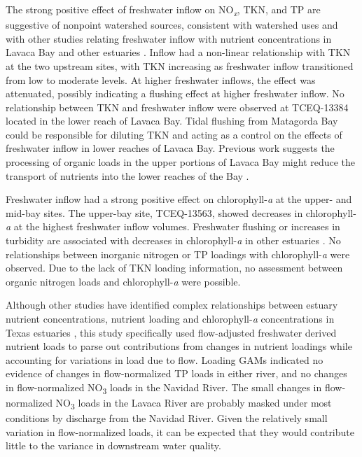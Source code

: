 \documentclass[sn-basic,referee,lineno,pdflatex]{sn-jnl}
\begin{document}
The strong positive effect of freshwater inflow on
NO\textsubscript{\emph{x}}, TKN, and TP are suggestive of nonpoint
watershed sources, consistent with watershed uses and with other studies
relating freshwater inflow with nutrient concentrations in Lavaca Bay
and other estuaries
\citep{russell_effect_2006, caffreyHighNutrientPulses2007, peierlsNonmonotonicResponsesPhytoplankton2012, palmerImpactsDroughtsLow2015, ciraPhytoplanktonDynamicsLowinflow2021}.
Inflow had a non-linear relationship with TKN at the two upstream sites,
with TKN increasing as freshwater inflow transitioned from low to
moderate levels. At higher freshwater inflows, the effect was
attenuated, possibly indicating a flushing effect at higher freshwater
inflow. No relationship between TKN and freshwater inflow were observed
at TCEQ-13384 located in the lower reach of Lavaca Bay. Tidal flushing
from Matagorda Bay could be responsible for diluting TKN and acting as a
control on the effects of freshwater inflow in lower reaches of Lavaca
Bay. Previous work suggests the processing of organic loads in the upper
portions of Lavaca Bay might reduce the transport of nutrients into the
lower reaches of the Bay \citep{russell_effect_2006}.

Freshwater inflow had a strong positive effect on chlorophyll-\emph{a}
at the upper- and mid-bay sites. The upper-bay site, TCEQ-13563, showed
decreases in chlorophyll-\emph{a} at the highest freshwater inflow
volumes. Freshwater flushing or increases in turbidity are associated
with decreases in chlorophyll-\emph{a} in other estuaries
\citep{peierlsNonmonotonicResponsesPhytoplankton2012, cloernPhytoplanktonPrimaryProduction2014}.
No relationships between inorganic nitrogen or TP loadings with
chlorophyll-\emph{a} were observed. Due to the lack of TKN loading
information, no assessment between organic nitrogen loads and
chlorophyll-\emph{a} were possible.

Although other studies have identified complex relationships between
estuary nutrient concentrations, nutrient loading and
chlorophyll-\emph{a} concentrations in Texas estuaries
\citep{ornolfsdottirNutrientPulsingRegulator2004, doradoUnderstandingInteractionsFreshwater2015, ciraPhytoplanktonDynamicsLowinflow2021, tominackVariabilityPhytoplanktonBiomass2022},
this study specifically used flow-adjusted freshwater derived nutrient
loads to parse out contributions from changes in nutrient loadings while
accounting for variations in load due to flow. Loading GAMs indicated no
evidence of changes in flow-normalized TP loads in either river, and no
changes in flow-normalized NO\textsubscript{3} loads in the Navidad
River. The small changes in flow-normalized NO\textsubscript{3} loads in
the Lavaca River are probably masked under most conditions by discharge
from the Navidad River. Given the relatively small variation in
flow-normalized loads, it can be expected that they would contribute
little to the variance in downstream water quality.
\end{document}
